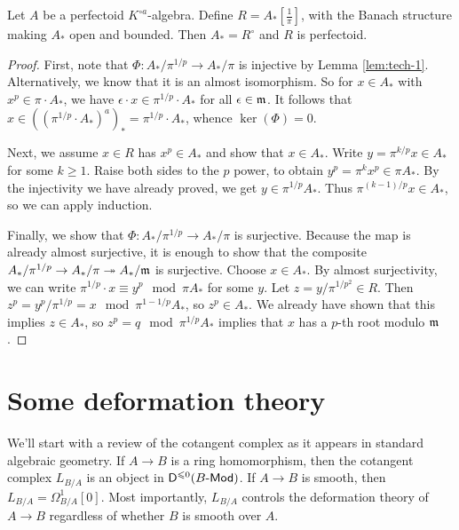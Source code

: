 \documentclass{article}
\begin{document}
\begin{proposition}
Let $A$ be a perfectoid $K^{\circ a}$-algebra. Define $R=A_\ast[\frac 1 \pi]$, with 
the Banach structure making $A_\ast$ open and bounded. Then $A_\ast = R^\circ$ 
and $R$ is perfectoid. 
\end{proposition}
\begin{proof}
First, note that $\Phi:A_\ast/\pi^{1/p} \to A_\ast/\pi$ is injective by Lemma 
\ref{lem:tech-1}. Alternatively, we know that it is an almost isomorphism. So 
for $x\in A_\ast$ with $x^p\in \pi\cdot A_\ast$, we have  
$\epsilon\cdot x\in \pi^{1/p}\cdot A_\ast$ for all $\epsilon\in\mathfrak{m}$. It follows 
that $x\in ((\pi^{1/p}\cdot A_\ast)^a)_\ast = \pi^{1/p}\cdot A_\ast$, whence 
$\ker(\Phi)=0$. 

Next, we assume $x\in R$ has $x^p\in A_\ast$ and show that $x\in A_\ast$. Write 
$y=\pi^{k/p} x\in A_\ast$ for some $k\geqslant 1$. Raise both sides to the $p$ 
power, to obtain $y^p=\pi^k x^p\in \pi A_\ast$. By the injectivity we have already 
proved, we get $y\in \pi^{1/p} A_\ast$. Thus 
$\pi^{(k-1)/p} x\in A_\ast$, so we can apply induction. 

Finally, we show that $\Phi:A_\ast/\pi^{1/p} \to A_\ast/\pi$ is surjective. Because 
the map is already almost surjective, it is enough to show that the composite 
$A_\ast/\pi^{1/p} \to A_\ast/\pi \twoheadrightarrow A_\ast/\mathfrak{m}$ is surjective. 
Choose $x\in A_\ast$. By almost surjectivity, we can write 
$\pi^{1/p}\cdot x \equiv y^p\mod \pi A_\ast$ for some $y$. Let $z=y/\pi^{1/p^2}\in R$. Then 
$z^p = y^p/\pi^{1/p} = x\mod \pi^{1-1/p} A_\ast$, so $z^p\in A_\ast$. We already 
have shown that this implies $z\in A_\ast$, so $z^p=q\mod \pi^{1/p} A_\ast$ implies 
that $x$ has a $p$-th root modulo $\mathfrak{m}$. 
\end{proof}





\section{Some deformation theory}

We'll start with a review of the cotangent complex as it appears in standard 
algebraic geometry. If $A\to B$ is a ring homomorphism, then the cotangent 
complex $L_{B/A}$ is an object in $\mathsf D^{\leqslant 0}(B\textnormal{-}\mathsf{Mod})$. If 
$A\to B$ is smooth, then $L_{B/A} = \Omega_{B/A}^1[0]$. Most importantly, 
$L_{B/A}$ controls the deformation theory of $A\to B$ regardless of whether $B$ 
is smooth over $A$. 
\end{document}
